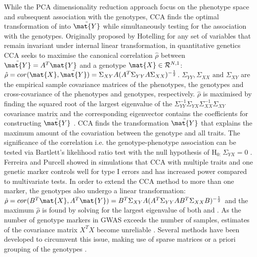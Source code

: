 While the PCA dimensionality reduction approach focus on the phenotype space and subsequent association with the genotypes, CCA finds the optimal transformation of  into \(\tilde{\mat{Y}}\) while simultaneously testing for the association with the genotypes. Originally proposed by Hotelling for any set of variables that remain invariant under internal linear transformation\citeyear{Hotelling1936}, in quantitative genetics CCA seeks to maximise the canonical correlation \(\hat{\rho}\) between  \(\tilde{\mat{Y}}= A^T\mat{Y}\) and a genotype \(\mat{X} \in \mathcal{R}^{N,1}\):   \(\hat{\rho} = cor(\mat{X},\tilde{\mat{Y}}) = \Sigma_{XY}A(A^T\Sigma_{YY}A\Sigma_{XX})^{-\frac{1}{2}}\). \(\Sigma_{YY},\Sigma_{XX} \text{ and } \Sigma_{XY}\) are the empirical sample covariance matrices of the phenotypes, the genotypes and cross-covariance of the phenotypes and genotypes, respectively. \(\hat{\rho}\) is maximised by finding the squared root of the largest eigenvalue of the \(\Sigma_{YY}^{-1}\Sigma_{YX}\Sigma_{XX}^{-1}\Sigma_{XY}\) covariance matrix and the corresponding eigenvector  contains the coefficients for constructing \(\tilde{\mat{Y}}\) \citep{Yang2102}. CCA finds the transformation \(\tilde{\mat{Y}}\) that explains the maximum amount of the covariation between the genotype and all traits. The significance of the correlation i.e. the genotype-phenotype association can be tested via Bartlett's likelihood ratio test with the null hypothesis of \(\text{H}_\text{0: }\Sigma_{YX} = 0\) \citep{Bartlett1941}. Ferreira and Purcell showed in simulations that CCA with multiple traits and one genetic marker  controls well for type I errors and has increased power compared to multivariate tests. In order to extend the CCA method to more than one marker, the genotypes also undergo a linear transformation: 
 \(\hat{\rho} = cor(B^T\mat{X},A^T\mat{Y}) = B^T\Sigma_{XY}A(A^T\Sigma_{YY}AB^T\Sigma_{XX}B)^{-\frac{1}{2}}\) and the maximum \(\hat{\rho}\) is found by solving for the largest eigenvalue of both  and . As the number of genotype markers in GWAS exceeds the number of samples, estimates of the covariance matrix \(X^TX\) become unreliable \citep{Schaefer2005}. Several methods have been developed to circumvent this issue, making use of sparse matrices \citep{Parkhomenko2009} or a priori grouping of the genotypes \citep{Naylor2010}. 

